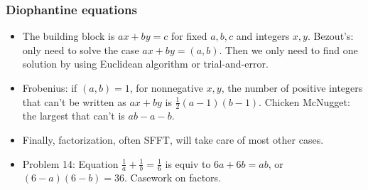 \documentclass[10pt,paper=letter]{scrartcl}
\begin{document}
\subsubsection*{Diophantine equations}

\begin{itemize}
  \item The building block is $ax + by = c$ for fixed $a, b, c$ and integers $x, y$. Bezout's: only need to solve the case $ax + by = (a,b)$. Then we only need to find one solution by using Euclidean algorithm or trial-and-error.
  \item Frobenius: if $(a, b) = 1$, for nonnegative $x, y$, the number of positive integers that can't be written as $ax+by$ is $\frac12(a-1)(b-1)$. Chicken McNugget: the largest that can't is $ab - a - b$.
  \item Finally, factorization, often SFFT, will take care of most other cases.
  \item Problem 14: Equation $\frac1a + \frac1b = \frac16$ is equiv to $6a + 6b = ab$, or $(6-a)(6-b)=36$. Casework on factors.
\end{itemize}
\end{document}
